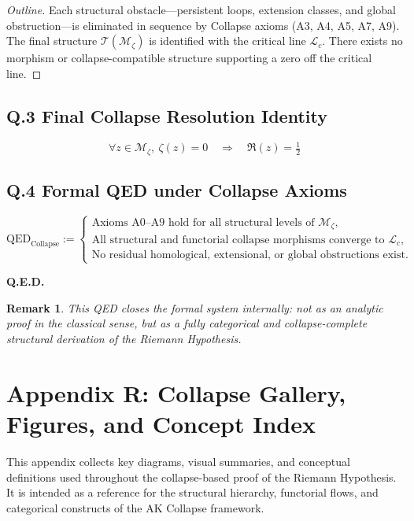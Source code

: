 \documentclass[11pt]{article}
\newtheorem{remark}[theorem]{Remark}
\begin{document}
\begin{proof}[Outline]
Each structural obstacle—persistent loops, extension classes, and global obstruction—is eliminated in sequence by  
Collapse axioms (A3, A4, A5, A7, A9). The final structure $\mathcal{T}(\mathcal{M}_\zeta)$ is identified with the critical line $\mathcal{L}_c$.  
There exists no morphism or collapse-compatible structure supporting a zero off the critical line.
\end{proof}

\subsection*{Q.3 Final Collapse Resolution Identity}

\[
\boxed{
\forall z \in \mathcal{M}_\zeta,\ \zeta(z) = 0 \quad \Rightarrow \quad \Re(z) = \tfrac{1}{2}
}
\]

\subsection*{Q.4 Formal QED under Collapse Axioms}

\[
\boxed{
\text{QED}_{\text{Collapse}} :=
\left\{
\begin{array}{l}
\text{Axioms A0--A9 hold for all structural levels of } \mathcal{M}_\zeta, \\
\text{All structural and functorial collapse morphisms converge to } \mathcal{L}_c, \\
\text{No residual homological, extensional, or global obstructions exist.}
\end{array}
\right.
}
\]


\begin{center}
\Huge
\textbf{Q.E.D.}
\end{center}

\begin{remark}
This QED closes the formal system internally:  
not as an analytic proof in the classical sense,  
but as a fully categorical and collapse-complete structural derivation of the Riemann Hypothesis.
\end{remark}



\section*{Appendix R: Collapse Gallery, Figures, and Concept Index}

This appendix collects key diagrams, visual summaries, and conceptual definitions used throughout the collapse-based proof of the Riemann Hypothesis.  
It is intended as a reference for the structural hierarchy, functorial flows, and categorical constructs of the AK Collapse framework.
\end{document}
